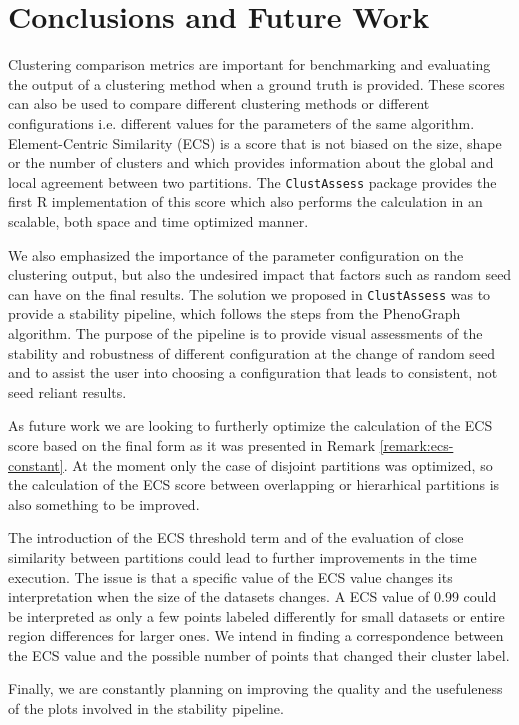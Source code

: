 \chapter*{Conclusions and Future Work} 

Clustering comparison metrics are important for benchmarking and evaluating the output of a clustering method when a ground truth is provided. These scores can also be used to compare different clustering methods or different configurations i.e. different values for the parameters of the same algorithm. Element-Centric Similarity (ECS) is a score that is not biased on the size, shape or the number of clusters and which provides information about the global and local agreement between two partitions. The \verb|ClustAssess| package provides the first R implementation of this score which also performs the calculation in an scalable, both space and time optimized manner.

We also emphasized the importance of the parameter configuration on the clustering output, but also the undesired impact that factors such as random seed can have on the final results. The solution we proposed in \verb|ClustAssess| was to provide a stability pipeline, which follows the steps from the PhenoGraph algorithm. The purpose of the pipeline is to provide visual assessments of the stability and robustness of different configuration at the change of random seed and to assist the user into choosing a configuration that leads to consistent, not seed reliant results.

As future work we are looking to furtherly optimize the calculation of the ECS score based on the final form as it was presented in Remark \ref{remark:ecs-constant}. At the moment only the case of disjoint partitions was optimized, so the calculation of the ECS score between overlapping or hierarhical partitions is also something to be improved. 

The introduction of the ECS threshold term and of the evaluation of close similarity between partitions could lead to further improvements in the time execution. The issue is that a specific value of the ECS value changes its interpretation when the size of the datasets changes. A ECS value of 0.99 could be interpreted as only a few points labeled differently for small datasets or entire region differences for larger ones. We intend in finding a correspondence between the ECS value and the possible number of points that changed their cluster label.

Finally, we are constantly planning on improving the quality and the usefuleness of the plots involved in the stability pipeline.
